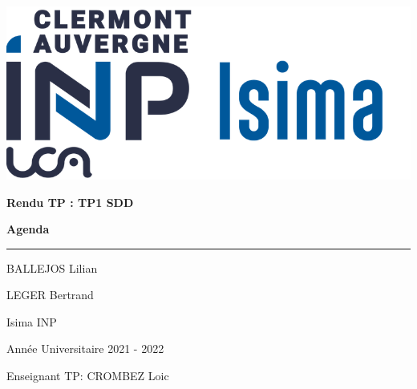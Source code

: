 \documentclass[12pt,french]{article} %
\begin{document}
\begin{titlepage} %

  \begin{center}
  	\includegraphics[scale=1.6]{gardeisima.png}
  \end{center}
  	
  \vspace*{2.5cm} %
  
  \begin{center}\huge
    \textbf{Rendu TP : TP1 SDD} 
    
    \textbf{Agenda}
  \end{center}
  
  \hrule %
  
  \begin{center}
    \Large BALLEJOS Lilian
    
    \Large LEGER Bertrand
    
    \large Isima INP
    
    Année Universitaire 2021 - 2022
  \end{center}
  
  \begin{center}
  \end{center}
  
  \vspace*{2cm} 
  
  \begin{flushright}\footnotesize %
    Enseignant TP: CROMBEZ Loic
    

\end{flushright}
\end{titlepage}
\end{document}
